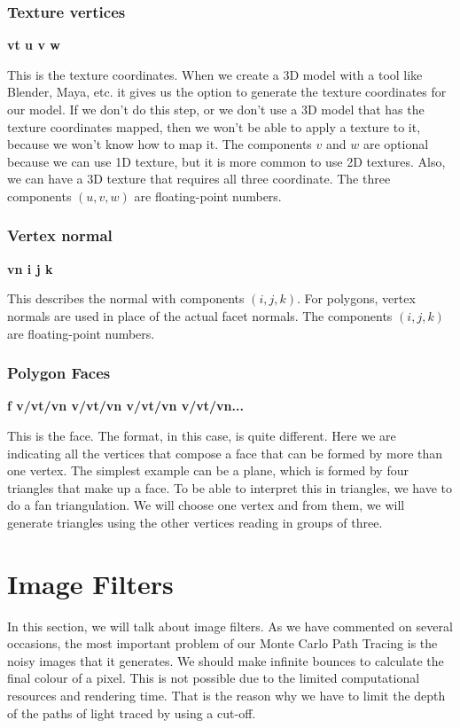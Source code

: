 \documentclass[titlepage,12pt]{report}
\begin{document}
\subsubsection{Texture vertices}

\textbf{vt u v w}

This is the texture coordinates. When we create a 3D model with a tool like Blender, Maya, etc. it gives us the option to generate the texture coordinates for our model. If we don't do this step, or we don't use a 3D model that has the texture coordinates mapped, then we won't be able to apply a texture to it, because we won't know how to map it. The components $v$ and $w$ are optional because we can use 1D texture, but it is more common to use 2D textures. Also, we can have a 3D texture that requires all three coordinate. The three components $(u, v, w)$ are floating-point numbers.

\subsubsection{Vertex normal}

\textbf{vn i j k}

This describes the normal with components $(i,j,k)$. For polygons, vertex normals are used in place of the actual facet normals. The components $(i,j,k)$ are floating-point numbers.

\subsubsection{Polygon Faces}

\textbf{f v/vt/vn v/vt/vn v/vt/vn v/vt/vn...}

This is the face. The format, in this case, is quite different. Here we are indicating all the vertices that compose a face that can be formed by more than one vertex. The simplest example can be a plane, which is formed by four triangles that make up a face. To be able to interpret this in triangles, we have to do a fan triangulation. We will choose one vertex and from them, we will generate triangles using the other vertices reading in groups of three.

\section{Image Filters}

In this section, we will talk about image filters. As we have commented on several occasions, the most important problem of our Monte Carlo Path Tracing is the noisy images that it generates. We should make infinite bounces to calculate the final colour of a pixel. This is not possible due to the limited computational resources and rendering time. That is the reason why we have to limit the depth of the paths of light traced by using a cut-off.
\end{document}
